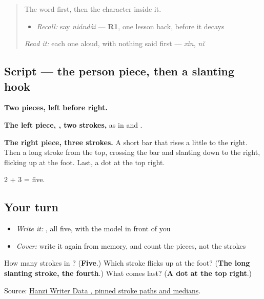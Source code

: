 \label{lesson:ZH-W323-dai-era}



\begin{quote}
The word first, then the character inside it.

\begin{itemize}
\raggedright
  \item \emph{Recall:} say \emph{niándài} — \textbf{R1}, one lesson back, before it decays
\end{itemize}

\begin{quote}
 
\end{quote}

\emph{Read it:} each one aloud, with nothing said first — \emph{xìn}, \emph{nǐ}
\end{quote}

\subsection*{Script — the person piece, then a slanting hook}

\begin{quote}
\end{quote}

\textbf{Two pieces, left before right.}

\textbf{The left piece, , two strokes,} as in  and .

\textbf{The right piece, three strokes.} A short bar that rises a little to the right. Then a long stroke from the top, crossing the bar and slanting down to the right, flicking up at the foot. Last, a dot at the top right.

2 + 3 = five.

\subsection*{Your turn}
\begin{itemize}
\raggedright
  \item \emph{Write it:} , all five, with the model in front of you
  \item \emph{Cover:} write it again from memory, and count the pieces, not the strokes
\end{itemize}

\begin{tcolorbox}[breakable,colback=teal!4,colframe=teal!35!black,title={Before you move on}]
How many strokes in ? (\textbf{Five}.) Which stroke flicks up at the foot? (\textbf{The long slanting stroke, the fourth}.) What comes last? (\textbf{A dot at the top right}.)

Source: \href{https://raw.githubusercontent.com/chanind/hanzi-writer-data/68d10a4b21150cae5e1ebbd223eed289cf32d90c/data/\%E4\%BB\%A3.json}{Hanzi Writer Data , pinned stroke paths and medians}.
\end{tcolorbox}
